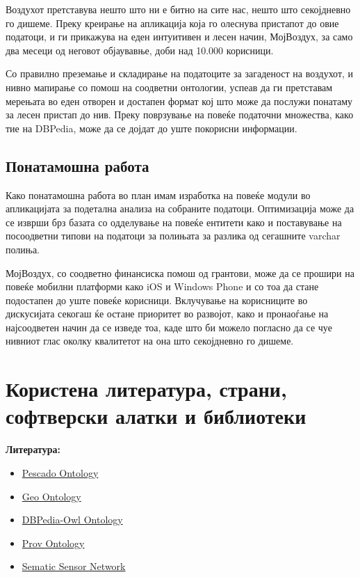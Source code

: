\documentclass{uvamscse}
\begin{document}
Воздухот претставува нешто што ни е битно на сите нас, нешто што секојдневно го дишеме. Преку креирање на апликација која го олеснува пристапот до овие податоци, и ги прикажува на еден интуитивен и лесен начин, МојВоздух, за само два месеци од неговот објаувавње, доби над 10.000 корисници.
\vspace{5mm}

Со правилно преземање и складирање на податоците за загаденост на воздухот, и нивно мапирање со помош на соодветни онтологии, успеав да ги претставам мерењата во еден отворен и достапен формат кој што може да послужи понатаму за лесен пристап до нив. Преку поврзување на повеќе податочни множества, како тие на DBPedia, може да се дојдат до уште покорисни информации.

\section{Понатамошна работа}

Како понатамошна работа во план имам изработка на повеќе модули во апликацијата за подетална анализа на собраните податоци. Оптимизација може да се изврши брз базата со одделување на повеќе ентитети како и поставување на посоодветни типови на податоци за полињата за разлика од сегашните varchar полиња.
\vspace{5mm}

МојВоздух, со соодветно финансиска помош од грантови, може да се прошири на повеќе мобилни платформи како iOS и Windows Phone и со тоа да стане подостапен до уште повеќе корисници. Вклучување на корисниците во дискусијата секогаш ќе остане приоритет во развојот, како и пронаоѓање на најсоодветен начин да се изведе тоа, каде што би можело погласно да се чуе нивниот глас околку квалитетот на она што секојдневно го дишеме.



\chapter{Користена литература, страни, софтверски алатки и библиотеки}

\textbf{\large{Литература:}}
\begin{itemize}
\item \href{https://ontohub.org/fois-ontology-competition/PESCaDO_Ontology}{Pescado Ontology}
\item \href{http://www.w3.org/2005/Incubator/geo/XGR-geo-ont-20071023/}{Geo Ontology}
\item \href{http://dbpedia.org/ontology/}{DBPedia-Owl Ontology}
\item \href{http://www.w3.org/TR/prov-o/}{Prov Ontology}
\item \href{http://www.w3.org/2005/Incubator/ssn/ssnx/ssn}{Sematic Sensor Network}
\end{itemize}
\end{document}
